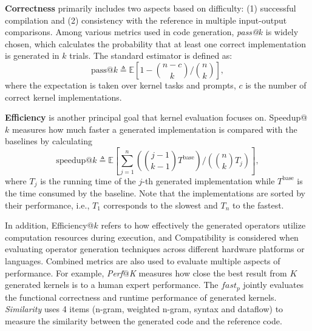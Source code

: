 \textbf{Correctness} primarily includes two aspects based on difficulty: (1) successful compilation and (2) consistency with the reference in multiple input-output comparisons.
Among various metrics used in code generation, \textit{pass@}$k$ is widely chosen, which calculates the probability that at least one correct implementation is generated in $k$ trials. The standard estimator is defined as:
\begin{equation}
\text{pass@}k \triangleq \mathbb{E}\left[1-\binom{n-c}{k}
/\binom{n}{k}\right],
\end{equation}
where the expectation is taken over kernel tasks and prompts, $c$ is the number of correct kernel implementations. 

\textbf{Efficiency} is another principal goal that kernel evaluation focuses on.
Speedup@$k$ measures how much faster a generated implementation is compared with the baselines by calculating
\begin{equation}
\text{speedup@}k \triangleq \mathbb{E}\left[\sum_{j=1}^n \left(\binom{j-1}{k-1}T^{\mathrm{base}}\right)/\left(\binom{n}{k}T_j\right)\right],
\end{equation}
where $T_j$ is the running time of the $j$-th generated implementation while $T^{\mathrm{base}}$ is the time consumed by the baseline. Note that the implementations are sorted by their performance, i.e., $T_1$ corresponds to the slowest and $T_n$ to the fastest.


In addition, Efficiency@$k$ refers to how effectively the generated operators utilize computation resources during execution, and Compatibility is considered when evaluating operator generation techniques across different hardware platforms or languages. Combined metrics are also used to evaluate multiple aspects of performance. For example, \textit{Perf$@$K} measures how close the best result from $K$ generated kernels is to a human expert performance. The \textit{$fast_p$} jointly evaluates the functional correctness and runtime performance of generated kernels. \textit{Similarity} uses 4 items (n-gram, weighted n-gram, syntax and dataflow) to measure the similarity between the generated code and the reference code.

